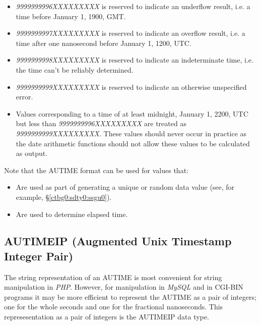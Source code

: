 \begin{itemize}
\item \emph{9999999996XXXXXXXXX} is reserved to
      indicate an underflow result, i.e. a time
      before January 1, 1900, GMT.
\item \emph{9999999997XXXXXXXXX} is reserved to
      indicate an overflow result, i.e. a time
      after one nanosecond before 
      January 1, 1200, UTC.
\item \emph{9999999998XXXXXXXXX} is reserved to
      indicate an indeterminate time, i.e. the
      time can't be reliably determined.
\item \emph{9999999999XXXXXXXXX} is reserved to
      indicate an otherwise unspecified error.
\item Values corresponding to a time of at least
      midnight, January 1, 2200, UTC but less than 
      \emph{9999999996XXXXXXXXX} are treated
      as \emph{9999999999XXXXXXXXX}.  These
      values should never occur in practice as the
      date arithmetic functions should not allow these
      values to be calculated as output.
\end{itemize}

Note that the AUTIME format can be used for values that:

\begin{itemize}
\item Are used as part of generating a unique or random data value
      (see, for example, \S{}\ref{ctbg0:sdty0:ssgu0}).
\item Are used to determine elapsed time.
\end{itemize}


\subsection{AUTIMEIP (Augmented Unix Timestamp Integer Pair)}
\label{ctbg0:sdty0:sati2}

The string representation of an AUTIME is most convenient for
string manipulation in \emph{PHP}.  However, for manipulation 
in \emph{MySQL} and in CGI-BIN programs it may be more efficient to
represent the AUTIME as a pair of integers; one for the whole seconds
and one for the fractional nanoseconds.  This represesentation as a pair
of integers is the AUTIMEIP data type.

